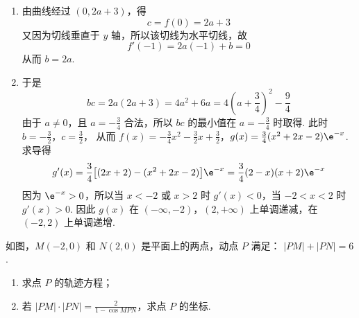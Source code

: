 \begin{solution}
\begin{enumerate}
\item 由曲线经过 \((0,2a+3)\)，得
\[
c=f(0)=2a+3
\]
又因为切线垂直于 \(y\) 轴，所以该切线为水平切线，故
\[
f'(-1)=2a(-1)+b=0
\]
从而 \(b=2a\).

\item 于是
\[
bc=2a(2a+3)=4a^{2}+6a=4\left(a+\frac{3}{4}\right)^{2}-\frac{9}{4}
\]
由于 \(a\neq0\)，且 \(a=-\frac{3}{4}\) 合法，所以 \(bc\) 的最小值在 \(a=-\frac{3}{4}\) 时取得. 此时
\(b=-\frac{3}{2}\)，\(c=\frac{3}{2}\)，
从而
\(f(x)=-\frac{3}{4}x^{2}-\frac{3}{2}x+\frac{3}{2}\)，\(g(x)=\frac{3}{4}(x^{2}+2x-2)\e^{-x}\).
求导得
\[
g'(x)=\frac{3}{4}\bigl[(2x+2)-(x^{2}+2x-2)\bigr]\e^{-x}
=\frac{3}{4}(2-x)(x+2)\e^{-x}
\]
因为 \(\e^{-x}>0\)，所以当 \(x<-2\) 或 \(x>2\) 时 \(g'(x)<0\)，当 \(-2<x<2\) 时 \(g'(x)>0\). 因此 \(g(x)\) 在 \((-\infty,-2)\)，\((2,+\infty)\) 上单调递减，在 \((-2,2)\) 上单调递增.
\end{enumerate}
\end{solution}

\begin{problem}
如图，\(M(-2,0)\) 和 \(N(2,0)\) 是平面上的两点，动点 \(P\) 满足： \(|PM| + |PN| = 6\).

\begin{enumerate}
\item 求点 \(P\) 的轨迹方程；
\item 若 \( |PM| \cdot |PN| = \frac{2}{1 - \cos MPN} \)，求点 \(P\) 的坐标.
\end{enumerate}

\FloatBarrier
\end{problem}


